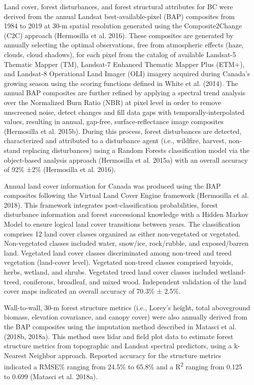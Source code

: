 \documentclass[10pt,oneside]{article}
\begin{document}
Land cover, forest disturbances, and forest structural attributes for BC
were derived from the annual Landsat best-available-pixel (BAP)
composites from 1984 to 2019 at 30-m spatial resolution generated using
the Composite2Change (C2C) approach (Hermosilla et al. 2016). These
composites are generated by annually selecting the optimal observations,
free from atmospheric effects (haze, clouds, cloud shadows), for each
pixel from the catalog of available Landsat-5 Thematic Mapper (TM),
Landsat-7 Enhanced Thematic Mapper Plus (ETM+), and Landsat-8
Operational Land Imager (OLI) imagery acquired during Canada's growing
season using the scoring functions defined in White et al. (2014). The
annual BAP composites are further refined by applying a spectral trend
analysis over the Normalized Burn Ratio (NBR) at pixel level in order to
remove unscreened noise, detect changes and fill data gaps with
temporally-interpolated values, resulting in annual, gap-free,
surface-reflectance image composites (Hermosilla et al. 2015b). During
this process, forest disturbances are detected, characterized and
attributed to a disturbance agent (i.e., wildfire, harvest, non-stand
replacing disturbances) using a Random Forests classification model via
the object-based analysis approach (Hermosilla et al. 2015a) with an
overall accuracy of 92\% ±2\% (Hermosilla et al. 2016).

Annual land cover information for Canada was produced using the BAP
composites following the Virtual Land Cover Engine framework (Hermosilla
et al. 2018). This framework integrates post-classification
probabilities, forest disturbance information and forest successional
knowledge with a Hidden Markov Model to ensure logical land cover
transitions between years. The classification comprises 12 land cover
classes organized as either non-vegetated or vegetated. Non-vegetated
classes included water, snow/ice, rock/rubble, and exposed/barren land.
Vegetated land cover classes discriminated among non-treed and treed
vegetation (land-cover level). Vegetated non-treed classes comprised
bryoids, herbs, wetland, and shrubs. Vegetated treed land cover classes
included wetland-treed, coniferous, broadleaf, and mixed wood.
Independent validation of the land cover maps indicated an overall
accuracy of 70.3\% ± 2.5\%.

Wall-to-wall, 30-m forest structure metrics (i.e., Lorey's height, total
aboveground biomass, elevation covariance, and canopy cover) were also
annually derived from the BAP composites using the imputation method
described in Matasci et al. (2018b, 2018a). This method uses lidar and
field plot data to estimate forest structure metrics from topographic
and Landsat spectral predictors, using a k-Nearest Neighbor approach.
Reported accuracy for the structure metrics indicated a RMSE\% ranging
from 24.5\% to 65.8\% and a R\textsuperscript{2} ranging from 0.125 to
0.699 (Matasci et al. 2018a).
\end{document}
